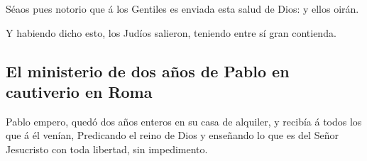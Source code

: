  Séaos pues notorio que á los Gentiles es enviada esta
salud de Dios: y ellos oirán.

 Y habiendo dicho esto, los Judíos salieron, teniendo entre
sí gran contienda.

\hypertarget{el-ministerio-de-dos-auxf1os-de-pablo-en-cautiverio-en-roma}{%
\subsection{El ministerio de dos años de Pablo en cautiverio en
Roma}\label{el-ministerio-de-dos-auxf1os-de-pablo-en-cautiverio-en-roma}}

 Pablo empero, quedó dos años enteros en su casa de
alquiler, y recibía á todos los que á él venían, 
Predicando el reino de Dios y enseñando lo que es del Señor Jesucristo
con toda libertad, sin impedimento.
